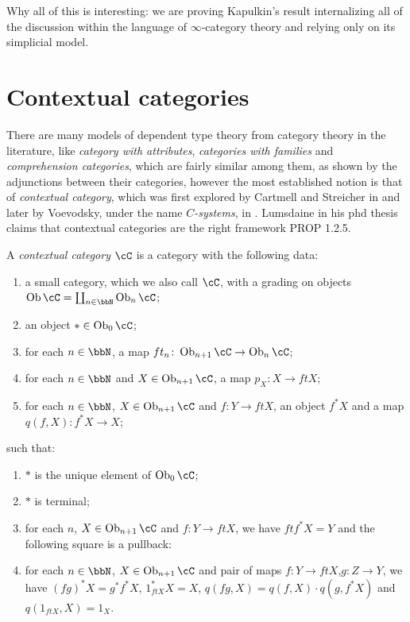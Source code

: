 \documentclass[a4paper,fontsize=12pt]{scrartcl}
\begin{document}
Why all of this is interesting: we are proving Kapulkin's result internalizing
all of the discussion within the language of $\infty$-category theory and
relying only on its simplicial model.

\section{Contextual categories}

There are many models of dependent type theory from category theory in
the literature, like \emph{category with attributes}, \emph{categories with
families} and \emph{comprehension categories}, which are
fairly similar among them, as shown by the adjunctions between their categories,
however the most established notion is that of \emph{contextual
category}, which was first explored by Cartmell and Streicher in
 and later by Voevodsky, under the name $C$\emph{-systems},
in . Lumsdaine in his phd thesis claims that contextual
categories are the right framework PROP 1.2.5.

\begin{defn}
  A \emph{contextual category} $\cC$ is a category with the following data:
  \begin{enumerate}
    \item a small category, which we also call $\cC$, with a grading on objects
      $\Ob\cC=\coprod_{n\in\bbN}\Ob_n\cC$;
    \item an object $*\in\Ob_0\cC$;
    \item for each $n\in\bbN$, a map
      $ft_n\colon\Ob_{n+1}\cC\rightarrow\Ob_n\cC$;
    \item for each $n\in\bbN$ and $X\in\Ob_{n+1}\cC$, a map $p_X\colon
      X\rightarrow ftX$;
    \item for each $n\in\bbN$, $X\in\Ob_{n+1}\cC$ and $f\colon Y\rightarrow
      ftX$, an object $f^*X$ and a map $q(f,X)\colon f^*X\rightarrow X$;
  \end{enumerate}
  such that:
  \begin{enumerate}
    \item $*$ is the unique element of $\Ob_0\cC$;
    \item $*$ is terminal;
    \item for each $n$, $X\in\Ob_{n+1}\cC$ and $f\colon Y\rightarrow ftX$, we
      have $ft f^*X=Y$ and the following square is a pullback:
    \item for each $n\in\bbN$, $X\in\Ob_{n+1}\cC$ and pair of maps $f\colon
      Y\rightarrow ft X$,$g\colon Z\rightarrow Y$, we have $(fg)^*X=g^*f^*X$,
      $1^*_{ftX}X=X$, $q(fg,X)=q(f,X)\cdot q(g,f^*X)$ and $q(1_{ftX},X)=1_X$.
  \end{enumerate}
\end{defn}
\end{document}
